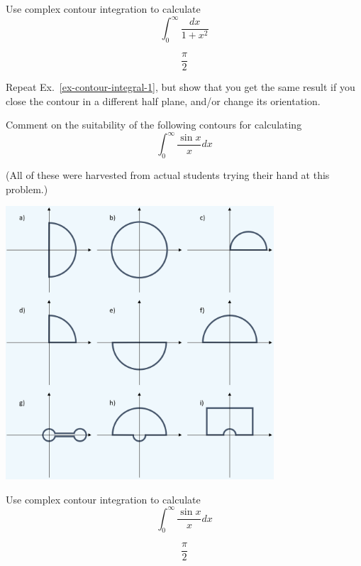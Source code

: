\begin{exer}
  \label{ex-contour-integral-1}
Use complex contour integration to calculate
$$\int_0^{\infty} \frac{dx}{1+x^2}$$
\begin{sol}
$$\frac{\pi}{2}$$
\end{sol}
\end{exer}

\begin{exer}
Repeat Ex.~\ref{ex-contour-integral-1}, but show that you get the same result if you close the contour in a different half plane, and/or change its orientation.
\end{exer}

\begin{exer}
  Comment on the suitability of the following contours for calculating
  $$ \int_0^{\infty} \frac{\sin x}{x} dx$$

  (All of these were harvested from actual students trying their hand at this problem.)

\begin{center}
\includegraphics[width=10cm]{complex/figures/contours}
\end{center}
  
\end{exer}

\begin{exer}
Use complex contour integration to calculate
$$ \int_0^{\infty} \frac{\sin x}{x} dx$$
\begin{sol}
$$\frac{\pi}{2}$$
\end{sol}
\end{exer}

